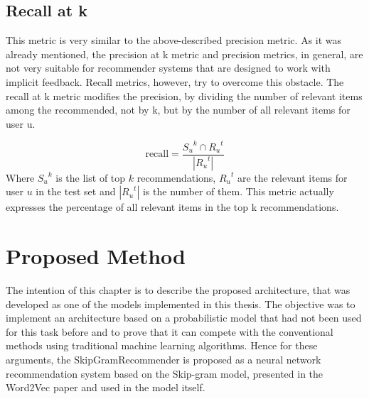 \section{Recall at k}
This metric is very similar to the above-described precision metric. As it was already mentioned, the precision at k metric and precision metrics, in general, are not very suitable for recommender systems that are designed to work with implicit feedback. Recall metrics, however, try to overcome this obstacle. The recall at k metric modifies the precision, by dividing the number of relevant items among the recommended, not by k, but by the number of all relevant items for user u.

\begin{equation}
    \text{recall} = \frac{{S_u}^k \cap {R_u}^t}{|{R_u}^t|}
\end{equation}
Where ${S_u}^k$ is the list of top $k$ recommendations, ${R_u}^t$ are the relevant items for user $u$ in the test set and $|{R_u}^t|$  is the number of them. This metric actually expresses the percentage of all relevant items in the top k recommendations.


\chapter{Proposed Method} \label{proposed}
The intention of this chapter is to describe the proposed architecture, that was developed as one of the models implemented in this thesis. The objective was to implement an architecture based on a probabilistic model that had not been used for this task before and to prove that it can compete with the conventional methods using traditional machine learning algorithms. Hence for these arguments, the SkipGramRecommender is proposed as a neural network recommendation system based on the Skip-gram model, presented in the Word2Vec paper \cite{Word2Vec} and used in the model itself.

